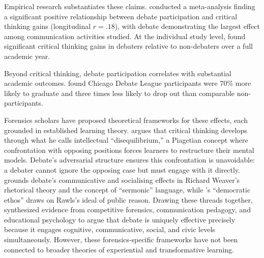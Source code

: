 Empirical research substantiates these claims. \textcite{allen1999meta} conducted a meta-analysis finding a significant positive relationship between debate participation and critical thinking gains (longitudinal $r = .18$), with debate demonstrating the largest effect among communication activities studied. At the individual study level, \textcite{colbert1987effects} found significant critical thinking gains in debaters relative to non-debaters over a full academic year.

Beyond critical thinking, debate participation correlates with substantial academic outcomes. \textcite{mezuk2009urban} found Chicago Debate League participants were 70\% more likely to graduate and three times less likely to drop out than comparable non-participants.

Forensics scholars have proposed theoretical frameworks for these effects, each grounded in established learning theory. \textcite{colbert1995enhancing} argues that critical thinking develops through what he calls intellectual ``disequilibrium,'' a Piagetian concept where confrontation with opposing positions forces learners to restructure their mental models. Debate's adversarial structure ensures this confrontation is unavoidable: a debater cannot ignore the opposing case but must engage with it directly. \textcite{cirlin1997sociological} grounds debate's communicative and socialising effects in Richard Weaver's rhetorical theory and the concept of ``sermonic'' language, while \textcite{hicks1998public}'s ``democratic ethos'' draws on Rawls's ideal of public reason. Drawing these threads together, \textcite{bellon2000research} synthesized evidence from competitive forensics, communication pedagogy, and educational psychology to argue that debate is uniquely effective precisely because it engages cognitive, communicative, social, and civic levels simultaneously. However, these forensics-specific frameworks have not been connected to broader theories of experiential and transformative learning.



